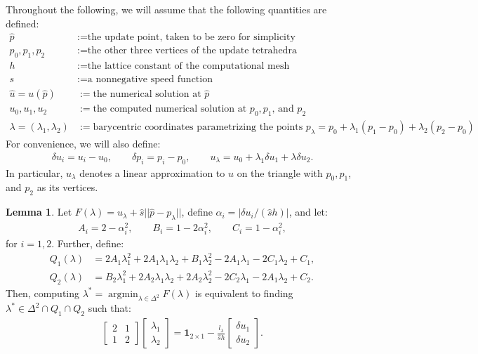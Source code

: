 \documentclass{article}
\theoremstyle{definition}
\newtheorem{lemma}{Lemma}
\begin{document}
Throughout the following, we will assume that the following quantities
are defined:
\begin{align*}
  \hat{p} &:= \text{the update point, taken to be zero for simplicity} \\
  p_0, p_1, p_2 &:= \text{the other three vertices of the update tetrahedra} \\
  h &:= \text{the lattice constant of the computational mesh} \\
  s &:= \text{a nonnegative speed function} \\
  \hat{u} = u(\hat{p}) &:= \text{the numerical solution at $\hat{p}$} \\
  u_0, u_1, u_2 &:= \text{the computed numerical solution at $p_0, p_1$, and $p_2$} \\
  \lambda = (\lambda_1, \lambda_2) &:= \text{barycentric coordinates parametrizing the points $p_\lambda = p_0 + \lambda_1 (p_1 - p_0) + \lambda_2 (p_2 - p_0)$}
\end{align*}
For convenience, we will also define:
\begin{align*}
  \delta u_i = u_i - u_0, \qquad \delta p_i = p_i - p_0, \qquad u_\lambda = u_0 + \lambda_1 \delta u_1 + \lambda \delta u_2.
\end{align*}
In particular, $u_\lambda$ denotes a linear approximation to $u$ on
the triangle with $p_0, p_1$, and $p_2$ as its vertices.

\begin{lemma}
  Let $F(\lambda) = u_\lambda + \hat{s} ||\hat{p} - p_\lambda||$,
  define $\alpha_i = |\delta u_i/(\hat{s} h)|$, and let:
  \begin{align*}
    A_i = 2 - \alpha_i^2, \qquad B_i = 1 - 2\alpha_i^2, \qquad C_i = 1 - \alpha_i^2,
  \end{align*}
  for $i = 1, 2$. Further, define:
  \begin{align*}
    Q_1(\lambda) &= 2A_1\lambda_1^2 + 2A_1\lambda_1\lambda_2 + B_1\lambda_2^2 -2A_1\lambda_1 -2C_1\lambda_2 + C_1, \\
    Q_2(\lambda) &= B_2\lambda_1^2 + 2A_2\lambda_1\lambda_2 + 2A_2\lambda_2^2 -2C_2\lambda_1 -2A_1\lambda_2 + C_2.
  \end{align*}
  Then, computing
  $\lambda^* = \operatorname{argmin}_{\lambda \in \Delta^2}
  F(\lambda)$ is equivalent to finding
  $\lambda^* \in \Delta^2 \cap Q_1 \cap Q_2$ such that:
  \begin{align*}
    \begin{bmatrix}
      2 & 1 \\ 1 & 2
    \end{bmatrix} \begin{bmatrix}
      \lambda_1 \\ \lambda_2
    \end{bmatrix} = \boldsymbol{1}_{2 \times 1} - \frac{l_\lambda}{\hat{s} h} \begin{bmatrix}
      \delta u_1 \\ \delta u_2
    \end{bmatrix}.
  \end{align*}
\end{lemma}
\end{document}
